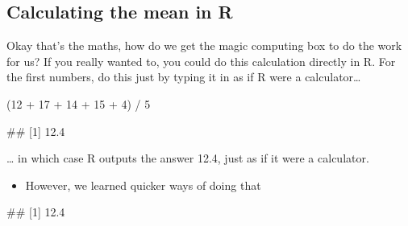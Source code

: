 \documentclass[
]{book}
\newenvironment{Shaded}{\begin{snugshade}}{\end{snugshade}}
\newcommand{\CommentTok}[1]{\textcolor[rgb]{0.56,0.35,0.01}{\textit{#1}}}
\newcommand{\DecValTok}[1]{\textcolor[rgb]{0.00,0.00,0.81}{#1}}
\newcommand{\FunctionTok}[1]{\textcolor[rgb]{0.00,0.00,0.00}{#1}}
\newcommand{\NormalTok}[1]{#1}
\newcommand{\SpecialCharTok}[1]{\textcolor[rgb]{0.00,0.00,0.00}{#1}}
\providecommand{\tightlist}{%
  \setlength{\itemsep}{0pt}\setlength{\parskip}{0pt}}
\begin{document}
\hypertarget{calculating-the-mean-in-r}{%
\subsection{Calculating the mean in R}\label{calculating-the-mean-in-r}}

Okay that's the maths, how do we get the magic computing box to do the work for us? If you really wanted to, you could do this calculation directly in R. For the first numbers, do this just by typing it in as if R were a calculator\ldots{}

\begin{Shaded}
\begin{Highlighting}[]
\NormalTok{(}\DecValTok{12} \SpecialCharTok{+} \DecValTok{17} \SpecialCharTok{+} \DecValTok{14} \SpecialCharTok{+} \DecValTok{15} \SpecialCharTok{+} \DecValTok{4}\NormalTok{) }\SpecialCharTok{/} \DecValTok{5}
\end{Highlighting}
\end{Shaded}

\begin{Shaded}
\begin{Highlighting}[]
\NormalTok{\#\# [1] 12.4}
\end{Highlighting}
\end{Shaded}

\ldots{} in which case R outputs the answer 12.4, just as if it were a calculator.

\begin{itemize}
\tightlist
\item
  However, we learned quicker ways of doing that
\end{itemize}

\begin{Shaded}
\end{Shaded}

\begin{Shaded}
\begin{Highlighting}[]
\NormalTok{\#\# [1] 12.4}
\end{Highlighting}
\end{Shaded}

\begin{Shaded}
\end{Shaded}
\end{document}
